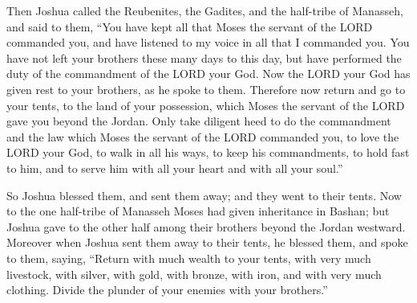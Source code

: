 \mychapter{} \myverse*{}Then Joshua called the Reubenites, the Gadites, and the half-tribe
of Manasseh,
\myverse{}and said to them, “You have kept all that Moses the servant of the LORD commanded
you, and have listened to my voice in all that I commanded you.
\myverse{}You have not left your brothers these many days to this day, but have performed
the duty of the commandment of the LORD your God.
\myverse{}Now the LORD your God has given rest to your brothers, as he spoke to them.
Therefore now return and go to your tents, to the land of your possession, which Moses the servant of
the LORD gave you beyond the Jordan.
\myverse{}Only take diligent heed to do the commandment and the law which Moses the servant
of the LORD commanded you, to love the LORD your God, to walk in all his ways, to keep his commandments,
to hold fast to him, and to serve him with all your heart and with all your soul.”

\myverse{}So Joshua blessed them, and sent them away; and they went to their
tents.
\myverse{}Now to the one half-tribe of Manasseh Moses had given inheritance in Bashan;
but Joshua gave to the other half among their brothers beyond the Jordan westward. Moreover when Joshua
sent them away to their tents, he blessed them,
\myverse{}and spoke to them, saying, “Return with much wealth to your tents, with very
much livestock, with silver, with gold, with bronze, with iron, and with very much clothing. Divide the
plunder of your enemies with your brothers.”

